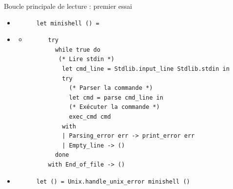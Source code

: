 \begin{frame}[fragile]{Boucle principale de lecture : premier essai}
  \begin{itemize}
    \item<1->
    \begin{lstlisting}
      let minishell () =
    \end{lstlisting}
    \item<2-> \begin{itemize} \item \begin{lstlisting}
      try
        while true do
         (* Lire stdin *)
          let cmd_line = Stdlib.input_line Stdlib.stdin in
          try
            (* Parser la commande *)
            let cmd = parse cmd_line in
            (* Exécuter la commande *)
            exec_cmd cmd
          with
          | Parsing_error err -> print_error err
          | Empty_line -> ()
        done
      with End_of_file -> ()
    \end{lstlisting} \end{itemize}
    \item <1->
    \begin{lstlisting}
      let () = Unix.handle_unix_error minishell ()
    \end{lstlisting}
    \end{itemize}
\end{frame}
